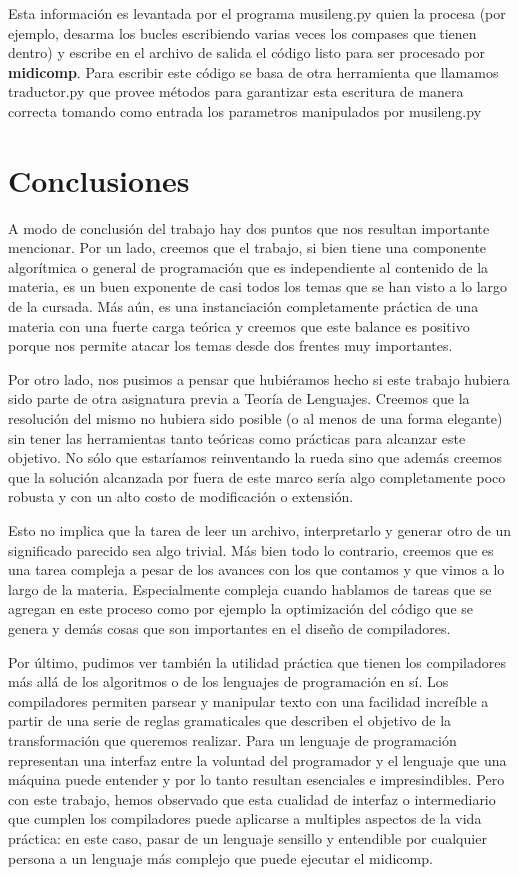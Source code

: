 Esta información es levantada por el programa musileng.py quien la procesa (por ejemplo, desarma los bucles escribiendo varias veces los compases que tienen dentro) y escribe en el archivo de salida el código listo para ser procesado por \textbf{midicomp}. Para escribir este código se basa de otra herramienta que llamamos traductor.py que provee métodos para garantizar esta escritura de manera correcta tomando como entrada los parametros manipulados por musileng.py

\section{Conclusiones}

A modo de conclusión del trabajo hay dos puntos que nos resultan importante mencionar. Por un lado, creemos que el trabajo, si bien
tiene una componente algorítmica o general de programación que es independiente al contenido de la materia, es un buen exponente
de casi todos los temas que se han visto a lo largo de la cursada. Más aún, es una instanciación completamente práctica de una
materia con una fuerte carga teórica y creemos que este balance es positivo porque nos permite atacar los temas desde dos
frentes muy importantes.

Por otro lado, nos pusimos a pensar que hubiéramos hecho si este trabajo hubiera sido parte de otra asignatura previa a 
Teoría de Lenguajes. Creemos que la resolución del mismo no hubiera sido posible (o al menos de una forma elegante) sin
tener las herramientas tanto teóricas como prácticas para alcanzar este objetivo. No sólo que estaríamos reinventando la rueda
sino que además creemos que la solución alcanzada por fuera de este marco sería algo completamente poco robusta y 
con un alto costo de modificación o extensión.

Esto no implica que la tarea de leer un archivo, interpretarlo y generar otro de un significado parecido sea algo trivial.
Más bien todo lo contrario, creemos que es una tarea compleja a pesar de los avances con los que contamos y que 
vimos a lo largo de la materia. Especialmente compleja cuando hablamos de tareas que se agregan en este proceso como
por ejemplo la optimización del código que se genera y demás cosas que son importantes en el diseño de compiladores.

Por último, pudimos ver también la utilidad práctica que tienen los compiladores más allá de los algoritmos o de los lenguajes de programación en sí. Los compiladores permiten parsear y manipular texto con una facilidad increíble a partir de una serie de reglas gramaticales que describen el objetivo de la transformación que queremos realizar. Para un lenguaje de programación representan una interfaz entre la voluntad del programador y el lenguaje que una máquina puede entender y por lo tanto resultan esenciales e impresindibles. Pero con este trabajo, hemos observado que esta cualidad de interfaz o intermediario que cumplen los compiladores puede aplicarse a multiples aspectos de la vida práctica: en este caso, pasar de un lenguaje sensillo y entendible por cualquier persona a un lenguaje más complejo que puede ejecutar el midicomp.

